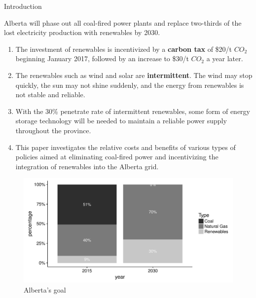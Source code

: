 \documentclass[final]{beamer}
\newlength{\onecolwid}
\begin{document}
\begin{frame}[t]
\begin{columns}[t]
\begin{column}{\onecolwid}
\begin{block}{Introduction}

Alberta will phase out all coal-fired power plants and replace two-thirds of the lost electricity production with renewables by 2030. 

\begin{enumerate}
	\item The investment of renewables is incentivized by a \textbf{carbon tax} of \$20/t $CO_2$ beginning January 2017, followed by an increase to \$30/t $CO_2$ a year later.   
	
	\item The renewables such as wind and solar are \textbf{intermittent}. The wind may stop quickly, the sun may not shine suddenly, and the energy from renewables is not stable and reliable.  
	
	\item With the 30\% penetrate rate of intermittent renewables, some form of energy storage technology will be needed to maintain a reliable power supply throughout the province. 
	
	\item This paper investigates the relative costs and benefits of various types of policies aimed at eliminating coal-fired power and incentivizing the integration of renewables into the Alberta grid.
\end{enumerate}

\begin{figure}
	\includegraphics[width=0.9\linewidth]{capacity}
	\caption{Alberta's goal}
\end{figure}


\end{block}



\end{column} %


\end{columns}
\end{frame}
\end{document}
